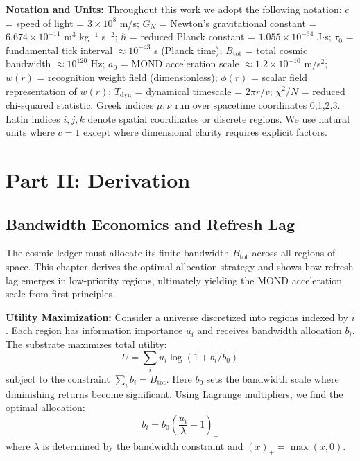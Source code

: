 \documentclass[12pt,letterpaper]{article}
\begin{document}
\textbf{Notation and Units:} Throughout this work we adopt the following notation: $c$ = speed of light = $3 \times 10^8$ m/s; $G_N$ = Newton's gravitational constant = $6.674 \times 10^{-11}$ m$^3$ kg$^{-1}$ s$^{-2}$; $\hbar$ = reduced Planck constant = $1.055 \times 10^{-34}$ J$\cdot$s; $\tau_0$ = fundamental tick interval $\approx 10^{-43}$ s (Planck time); $B_{\text{tot}}$ = total cosmic bandwidth $\approx 10^{120}$ Hz; $a_0$ = MOND acceleration scale $\approx 1.2 \times 10^{-10}$ m/s$^2$; $w(r)$ = recognition weight field (dimensionless); $\phi(r)$ = scalar field representation of $w(r)$; $T_{\text{dyn}}$ = dynamical timescale = $2\pi r/v$; $\chi^2/N$ = reduced chi-squared statistic. Greek indices $\mu, \nu$ run over spacetime coordinates 0,1,2,3. Latin indices $i,j,k$ denote spatial coordinates or discrete regions. We use natural units where $c = 1$ except where dimensional clarity requires explicit factors.

\section{Part II: Derivation}

\subsection{Bandwidth Economics and Refresh Lag}

The cosmic ledger must allocate its finite bandwidth $B_{\text{tot}}$ across all regions of space. This chapter derives the optimal allocation strategy and shows how refresh lag emerges in low-priority regions, ultimately yielding the MOND acceleration scale from first principles.

\textbf{Utility Maximization:} Consider a universe discretized into regions indexed by $i$. Each region has information importance $u_i$ and receives bandwidth allocation $b_i$. The substrate maximizes total utility:
\begin{equation}
U = \sum_i u_i \log(1 + b_i/b_0)
\end{equation}
subject to the constraint $\sum_i b_i = B_{\text{tot}}$. Here $b_0$ sets the bandwidth scale where diminishing returns become significant. Using Lagrange multipliers, we find the optimal allocation:
\begin{equation}
b_i = b_0 \left( \frac{u_i}{\lambda} - 1 \right)_+
\end{equation}
where $\lambda$ is determined by the bandwidth constraint and $(x)_+ = \max(x,0)$.
\end{document}
